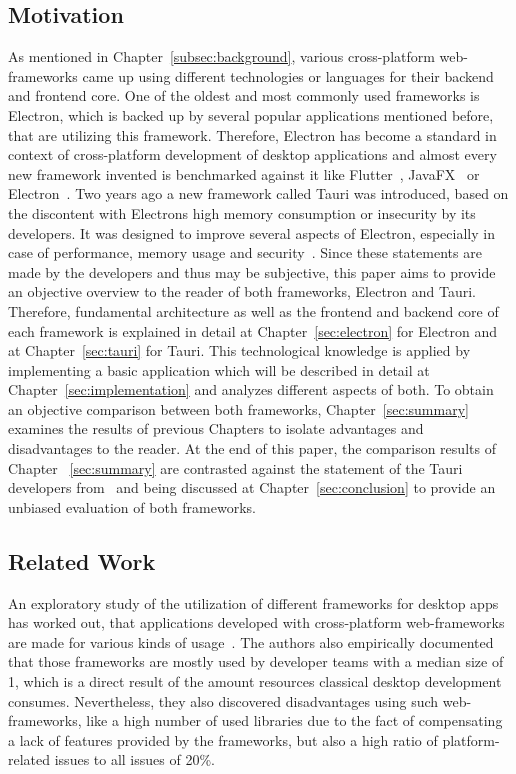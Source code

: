 \subsection{Motivation}\label{subsec:motivation}
As mentioned in Chapter~\ref{subsec:background}, various cross-platform web-frameworks came up using different technologies or languages for their backend and frontend core.
One of the oldest and most commonly used frameworks is Electron, which is backed up by several popular applications mentioned before, that are utilizing this framework.
Therefore, Electron has become a standard in context of cross-platform development of desktop applications and almost every new framework invented is benchmarked against it like Flutter~\cite{flutter}, JavaFX~\cite{electron-javafx} or Electron~\cite{electron-nwjs}.
Two years ago a new framework called Tauri was introduced, based on the discontent with Electrons high memory consumption or insecurity by its developers.
It was designed to improve several aspects of Electron, especially in case of performance, memory usage and security~\cite{tauri}.
Since these statements are made by the developers and thus may be subjective, this paper aims to provide an objective overview to the reader of both frameworks, Electron and Tauri.
Therefore, fundamental architecture as well as the frontend and backend core of each framework is explained in detail at Chapter~\ref{sec:electron} for Electron and at Chapter~\ref{sec:tauri} for Tauri.
This technological knowledge is applied by implementing a basic application which will be described in detail at Chapter~\ref{sec:implementation} and analyzes different aspects of both.
To obtain an objective comparison between both frameworks, Chapter~\ref{sec:summary} examines the results of previous Chapters
to isolate advantages and disadvantages to the reader.
At the end of this paper, the comparison results of Chapter ~\ref{sec:summary} are contrasted against the statement of the Tauri developers from~\cite{tauri} and being discussed at Chapter~\ref{sec:conclusion} to provide an unbiased
evaluation of both frameworks.

\subsection{Related Work}\label{subsec:related-work}
An exploratory study of the utilization of different frameworks for desktop apps has worked out, that applications developed with cross-platform web-frameworks are made for various kinds of usage~\cite{explorationstudy}.
The authors also empirically documented that those frameworks are mostly used by developer teams with a median size of 1, which is a direct result of the
amount resources classical desktop development consumes.
Nevertheless, they also discovered disadvantages using such web-frameworks, like a high number of used libraries due to the fact of compensating a lack of features provided by the frameworks,
but also a high ratio of platform-related issues to all issues of 20\%.

